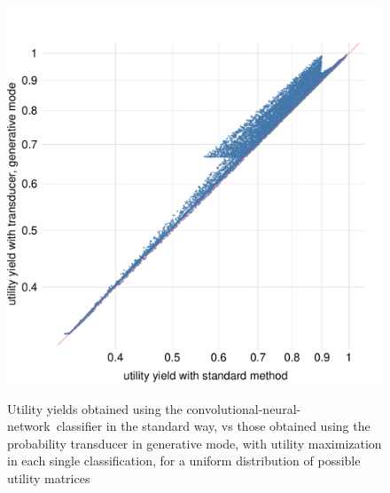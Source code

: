 \documentclass[\ifafour a4paper,12pt,\else a5paper,10pt,\fi%
onecolumn,oneside,article,%
british%
]{memoir}
\theoremstyle{remark}
\theoremstyle{innote}
\renewcommand*{\|}[1][]{\nonscript\:#1\vert\nonscript\:\mathopen{}}
\newcommand*{\cnn}{convolutional-neural-network}
\begin{document}
\begin{figure}[t]
  \centering
  \includegraphics[width=\linewidth]{CNN_transducer_gains_generx.pdf}\\
  \caption{Utility yields obtained using the \cnn\ classifier in the standard way, vs those obtained using the probability transducer in generative mode, with utility maximization in each single classification, for a uniform distribution of possible utility matrices}
  \label{fig:CNN_gain_gener_UMspace}
\end{figure}
\fi





\clearpage
\bigskip
\renewcommand*{\appendixpagename}{Appendices: mathematical and technical details}
\appendix
\end{document}
